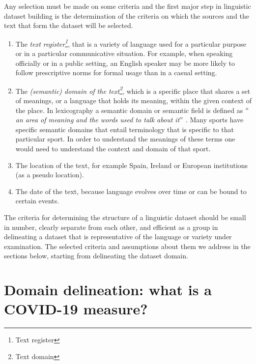 Any selection must be made on some criteria and the first major step in linguistic dataset building is the determination of the criteria on which the sources and the text that form the dataset will be selected.

\begin{enumerate}
	\item The \textit{text register\footnote{ Text register }}, that is a variety of language used for a particular purpose or in a particular communicative situation. For example, when speaking officially or in a public setting, an English speaker may be more likely to follow prescriptive norms for formal usage than in a casual setting. 
	\item The \textit{(semantic) domain of the text\footnote{ Text domain  }}, which is a specific place that shares a set of meanings, or a language that holds its meaning, within the given context of the place. In lexicography a semantic domain or semantic field is defined as \textit{$``$an area of meaning and the words used to talk about it$"$ }. Many sports have specific semantic domains that entail terminology that is specific to that particular sport. In order to understand the meanings of these terms one would need to understand the context and domain of that sport.
	\item The location of the text, for example Spain, Ireland or European institutions (as a pseudo location).
	\item The date of the text, because language evolves over time or can be bound to certain events. 
\end{enumerate}

The criteria for determining the structure of a linguistic dataset should be small in number, clearly separate from each other, and efficient as a group in delineating a dataset that is representative of the language or variety under examination. The selected criteria and assumptions about them we address in the sections below, starting from delineating the dataset domain. 

\section{Domain delineation: what is a COVID-19 measure?}
\label{sec:domain-delimitation}


